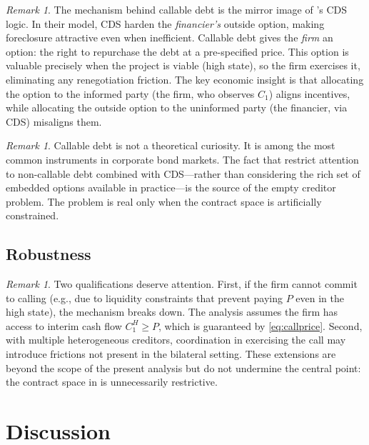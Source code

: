 \documentclass[12pt,a4paper]{article}
\theoremstyle{plain}
\theoremstyle{definition}
\theoremstyle{remark}
\newtheorem{remark}[theorem]{Remark}
\begin{document}
\begin{remark}\label{r:mechanism}
The mechanism behind callable debt is the mirror image of \citeauthor{boltonoehmke2011}'s CDS logic. In their model, CDS harden the \emph{financier's} outside option, making foreclosure attractive even when inefficient. Callable debt gives the \emph{firm} an option: the right to repurchase the debt at a pre-specified price. This option is valuable precisely when the project is viable (high state), so the firm exercises it, eliminating any renegotiation friction. The key economic insight is that allocating the option to the informed party (the firm, who observes $C_1$) aligns incentives, while allocating the outside option to the uninformed party (the financier, via CDS) misaligns them.
\end{remark}

\begin{remark}\label{r:prevalence}
Callable debt is not a theoretical curiosity. It is among the most common instruments in corporate bond markets. The fact that \citet{boltonoehmke2011} restrict attention to non-callable debt combined with CDS---rather than considering the rich set of embedded options available in practice---is the source of the empty creditor problem. The problem is real only when the contract space is artificially constrained.
\end{remark}

\subsection{Robustness}

\begin{remark}\label{r:robust}
Two qualifications deserve attention. First, if the firm cannot commit to calling (e.g., due to liquidity constraints that prevent paying $P$ even in the high state), the mechanism breaks down. The analysis assumes the firm has access to interim cash flow $C_1^H \geq P$, which is guaranteed by \eqref{eq:callprice}. Second, with multiple heterogeneous creditors, coordination in exercising the call may introduce frictions not present in the bilateral setting. These extensions are beyond the scope of the present analysis but do not undermine the central point: the contract space in \citet{boltonoehmke2011} is unnecessarily restrictive.
\end{remark}

\section{Discussion}
\end{document}

